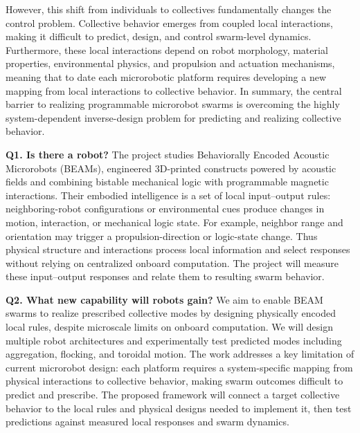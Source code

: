 \documentclass[11pt]{article}
\begin{document}
However, this shift from individuals to collectives fundamentally changes the control problem.
Collective behavior emerges from coupled local interactions, making it difficult to predict, design, and control swarm-level dynamics.
Furthermore, these local interactions depend on robot morphology, material properties, environmental physics, and propulsion and actuation mechanisms, meaning that to date each microrobotic platform requires developing a new mapping from local interactions to collective behavior.
In summary, the central barrier to realizing programmable microrobot swarms is overcoming the highly system-dependent inverse-design problem for predicting and realizing collective behavior.

\textbf{Q1. Is there a robot?}
The project studies Behaviorally Encoded Acoustic Microrobots (BEAMs), engineered 3D-printed constructs powered by acoustic fields and combining bistable mechanical logic with programmable magnetic interactions. 
Their embodied intelligence is a set of local input--output rules: neighboring-robot configurations or environmental cues produce changes in motion, interaction, or mechanical logic state. 
For example, neighbor range and orientation may trigger a propulsion-direction or logic-state change. 
Thus physical structure and interactions process local information and select responses without relying on centralized onboard computation. 
The project will measure these input--output responses and relate them to resulting swarm behavior.

\textbf{Q2. What new capability will robots gain?}
We aim to enable BEAM swarms to realize prescribed collective modes by designing physically encoded local rules, despite microscale limits on onboard computation. 
We will design multiple robot architectures and experimentally test predicted modes including aggregation, flocking, and toroidal motion. 
The work addresses a key limitation of current microrobot design: each platform requires a system-specific mapping from physical interactions to collective behavior, making swarm outcomes difficult to predict and prescribe. The proposed framework will connect a target collective behavior to the local rules and physical designs needed to implement it, then test predictions against measured local responses and swarm dynamics.
\end{document}
